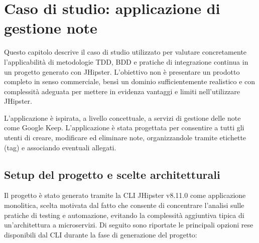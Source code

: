
\chapter{Caso di studio: applicazione di gestione note}
\label{cap:caso-studio}

Questo capitolo descrive il caso di studio utilizzato per valutare concretamente l’applicabilità di metodologie TDD, BDD e pratiche di integrazione continua in un progetto generato con JHipster. L’obiettivo non è presentare un prodotto completo in senso commerciale, bensì un dominio sufficientemente realistico e con complessità adeguata per mettere in evidenza vantaggi e limiti nell'utilizzare JHipster.

L'applicazione è ispirata, a livello concettuale, a servizi di gestione delle note come Google Keep. L'applicazione è stata progettata per consentire a tutti gli utenti di creare, modificare ed eliminare note, organizzandole tramite etichette (tag) e associando eventuali allegati.

\section{Setup del progetto e scelte architetturali}
\label{sec:setup-architettura}
Il progetto è stato generato tramite la CLI JHipster v8.11.0 come applicazione monolitica, scelta motivata dal fatto che consente di concentrare l’analisi sulle pratiche di testing e automazione, evitando la complessità aggiuntiva tipica di un’architettura a microservizi. Di seguito sono riportate le principali opzioni rese disponibili dal CLI durante la fase di generazione del progetto:

